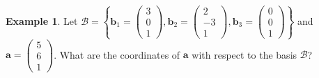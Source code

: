 \documentclass[
]{book}
\theoremstyle{definition}
\theoremstyle{definition}
\newtheorem{example}{Example}[chapter]
\theoremstyle{definition}
\theoremstyle{definition}
\theoremstyle{remark}
\begin{document}
\begin{example}
Let \(\mathcal{B} = \left\{ \mathbf{b}_1 = \begin{pmatrix} 3 \\ 0 \\ 1 \end{pmatrix}, \mathbf{b}_2 = \begin{pmatrix} 2 \\ -3 \\ 1 \end{pmatrix}, \mathbf{b}_3 = \begin{pmatrix} 0 \\ 0 \\ 1 \end{pmatrix} \right\}\) and \(\mathbf{a} = \begin{pmatrix} 5 \\ 6 \\ 1 \end{pmatrix}\). What are the coordinates of \(\mathbf{a}\) with respect to the basis \(\mathcal{B}\)?
\end{example}
\end{document}
